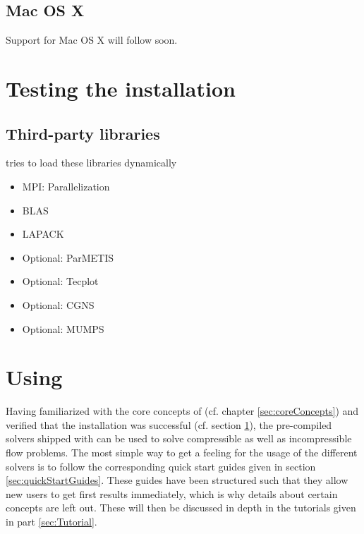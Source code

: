 \documentclass[a4paper,10pt]{report} %
\begin{document}
\subsection{Mac OS X}
Support for Mac OS X will follow soon.


\section{Testing the installation}
\label{sec:installation_testing}



\subsection{Third-party libraries}
\label{sec:installation_libraries}

\BoSSS{} tries to load these libraries dynamically
\begin{itemize}
	\item MPI: Parallelization
	\item BLAS
	\item LAPACK
	\item Optional: ParMETIS
	\item Optional: Tecplot
	\item Optional: CGNS
	\item Optional: MUMPS
\end{itemize}


\section{Using \BoSSS{}}
\label{sec:gettingStarted_using}

Having familiarized with the core concepts of \BoSSS{} (cf. chapter \ref{sec:coreConcepts}) and 
verified that the installation was successful (cf. section \ref{sec:installation_testing}), 
the pre-compiled solvers shipped with \BoSSS{} can be used to solve compressible as well as
 incompressible flow problems. The most simple way to get a feeling for the usage of the 
different solvers is to follow the corresponding quick start guides given in 
section \ref{sec:quickStartGuides}. These guides have been structured such that they allow new 
users to get first results immediately, which is why details about certain concepts are left out. 
These will then be discussed in depth in the tutorials given in part \ref{sec:Tutorial}.
\end{document}
